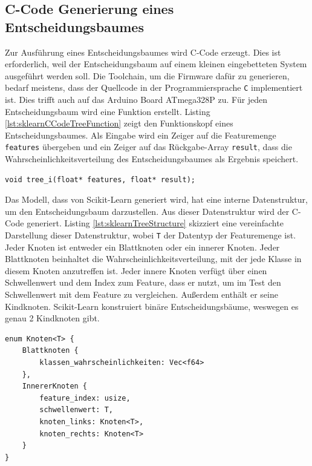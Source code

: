 \subsection{C-Code Generierung eines Entscheidungsbaumes}
\label{sec:cCodeTree}
Zur Ausführung eines Entscheidungsbaumes wird C-Code erzeugt. Dies ist erforderlich, weil der Entscheidungsbaum auf einem kleinen eingebetteten System ausgeführt werden soll. Die Toolchain, um die Firmware
dafür zu generieren, bedarf meistens, dass der Quellcode in der Programmiersprache \texttt{C} implementiert ist. Dies trifft auch auf das Arduino Board ATmega328P zu.
\newline
\newline
Für jeden Entscheidungsbaum wird eine Funktion erstellt. Listing \ref{lst:sklearnCCodeTreeFunction} zeigt den Funktionskopf eines Entscheidungsbaumes. Als Eingabe wird ein Zeiger auf die Featuremenge
\texttt{features} übergeben und ein Zeiger auf das Rückgabe-Array \texttt{result}, dass die Wahrscheinlichkeitsverteilung des Entscheidungsbaumes als Ergebnis speichert.
\begin{lstlisting}[label=lst:sklearnCCodeTreeFunction,caption={C-Code Funktionskopf eines Baumes $i$.}]
void tree_i(float* features, float* result);
\end{lstlisting}
Das Modell, dass von Scikit-Learn generiert wird, hat eine interne Datenstruktur, um den Entscheidungsbaum darzustellen. Aus dieser Datenstruktur wird der C-Code generiert. Listing
\ref{lst:sklearnTreeStructure} skizziert eine vereinfachte Darstellung dieser Datenstruktur, wobei \texttt{T} der Datentyp der Featuremenge ist. Jeder Knoten ist entweder ein Blattknoten oder
ein innerer Knoten. Jeder Blattknoten beinhaltet die Wahrscheinlichkeitsverteilung, mit der jede Klasse in diesem Knoten anzutreffen ist. Jeder innere Knoten verfügt über einen Schwellenwert und
dem Index zum Feature, dass er nutzt, um im Test den Schwellenwert mit dem Feature zu vergleichen. Außerdem enthält er seine Kindknoten. Scikit-Learn konstruiert binäre Entscheidungsbäume,
weswegen es genau 2 Kindknoten gibt.
\begin{lstlisting}[label=lst:sklearnTreeStructure,caption={Vereinfachte Skizze der Datenstruktur die von Scikit-Learn für Entscheidungsbäume genutzt wird.}]
enum Knoten<T> {
    Blattknoten {
        klassen_wahrscheinlichkeiten: Vec<f64>
    },
    InnererKnoten {
        feature_index: usize,
        schwellenwert: T,
        knoten_links: Knoten<T>,
        knoten_rechts: Knoten<T>
    }
}
\end{lstlisting}
